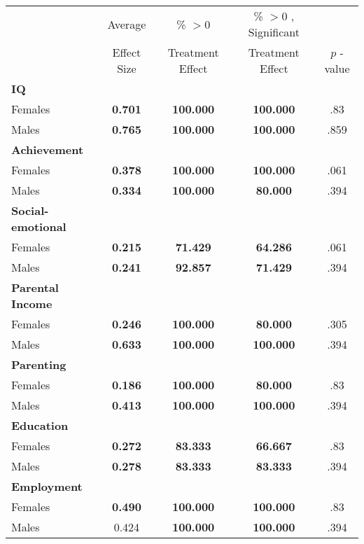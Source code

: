 \begin{tabular}{l c c c c}
\toprule
 & Average & \% $ >0 $ & \% $ >0 $ , Significant & \citet{Rosenbaum_2005_Distribution_JRSS} \\
 & Effect Size & Treatment Effect & Treatment Effect & $ p $ -value \\
\midrule
\textbf{IQ} & & & & \\
\quad Females &  \textbf{    0.701} & \textbf{  100.000} & \textbf{  100.000} & .83 \\
\quad Males &  \textbf{    0.765} & \textbf{  100.000} & \textbf{  100.000} & .859 \\
\midrule
\textbf{Achievement} & & & & \\
\quad Females &  \textbf{    0.378} & \textbf{  100.000} & \textbf{  100.000} & .061 \\
\quad Males &  \textbf{    0.334} & \textbf{  100.000} & \textbf{   80.000} & .394 \\
\midrule
\textbf{Social-emotional} & & & & \\
\quad Females &  \textbf{    0.215} & \textbf{   71.429} & \textbf{   64.286} & .061 \\
\quad Males &  \textbf{    0.241} & \textbf{   92.857} & \textbf{   71.429} & .394 \\
\midrule
\textbf{Parental Income} & & & & \\
\quad Females &  \textbf{    0.246} & \textbf{  100.000} & \textbf{   80.000} & .305 \\
\quad Males &  \textbf{    0.633} & \textbf{  100.000} & \textbf{  100.000} & .394 \\
\midrule
\textbf{Parenting} & & & & \\
\quad Females &  \textbf{    0.186} & \textbf{  100.000} & \textbf{   80.000} & .83 \\
\quad Males &  \textbf{    0.413} & \textbf{  100.000} & \textbf{  100.000} & .394 \\
\midrule
\textbf{Education} & & & & \\
\quad Females &  \textbf{    0.272} & \textbf{   83.333} & \textbf{   66.667} & .83 \\
\quad Males &  \textbf{    0.278} & \textbf{   83.333} & \textbf{   83.333} & .394 \\
\midrule
\textbf{Employment} & & & & \\
\quad Females &  \textbf{    0.490} & \textbf{  100.000} & \textbf{  100.000} & .83 \\
\quad Males &      0.424 & \textbf{  100.000} & \textbf{  100.000} & .394 \\

\end{tabular}
